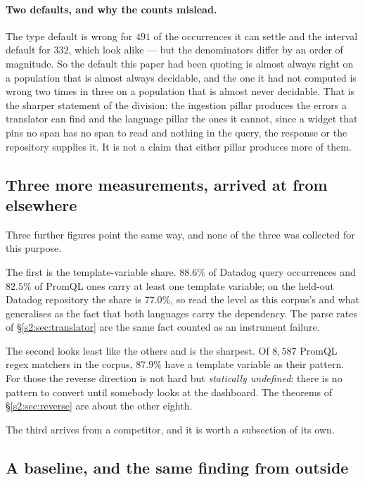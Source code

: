 \paragraph{Two defaults, and why the counts mislead.}
The type default is wrong for $491$ of the occurrences it can settle and the interval
default for $332$, which look alike --- but the denominators differ by an order of
magnitude. So the default this paper had been quoting is almost always right on a population
that is almost always decidable, and the one it had not computed is wrong two times in three
on a population that is almost never decidable. That is the sharper statement of the
division: the ingestion pillar produces the errors a translator can find and the language
pillar the ones it cannot, since a widget that pins no span has no span to read and nothing
in the query, the response or the repository supplies it. It is not a claim that either
pillar produces more of them.

\subsection{Three more measurements, arrived at from elsewhere}

Three further figures point the same way, and none of the three was collected for this
purpose.

The first is the template-variable share. $88.6\%$ of Datadog query occurrences and
$82.5\%$ of PromQL ones carry at least one template variable; on the held-out Datadog
repository the share is $77.0\%$, so read the level as this corpus's and what generalises
as the fact that both languages carry the dependency. The parse rates of
\S\ref{s2:sec:translator} are the same fact counted as an instrument failure.

The second looks least like the others and is the sharpest. Of $8{,}587$ PromQL regex
matchers in the corpus, $87.9\%$ have a template variable as their pattern. For those the
reverse direction is not hard but \emph{statically undefined}: there is no pattern to
convert until somebody looks at the dashboard. The theorems of \S\ref{s2:sec:reverse} are
about the other eighth.

The third arrives from a competitor, and it is worth a subsection of its own.

\subsection{A baseline, and the same finding from outside}
\label{s2:sec:baseline}

